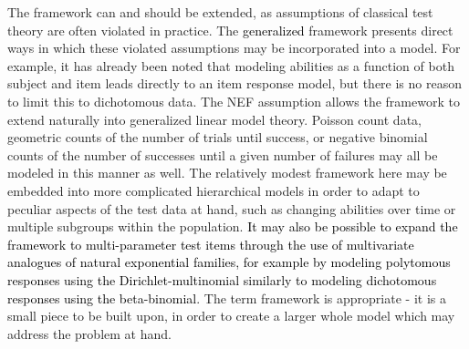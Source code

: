 \documentclass[12pt,epsfig]{article}
\newcommand{\change}[1]{\textcolor{black}{#1}}
\begin{document}
The framework can and should be extended, as assumptions of classical test theory are often violated in practice. The \change{generalized} framework presents direct ways in which these violated assumptions may be incorporated into a model.  For example, it has already been noted that modeling abilities as a function of both subject and item leads directly to an item response model, but there is no reason to limit this to dichotomous data. The NEF assumption allows the framework to extend naturally into generalized linear model theory. Poisson count data, geometric counts of the number of trials until success, or negative binomial counts of the number of successes until a given number of failures may all be modeled in this manner as well. The relatively modest framework here may be embedded into more complicated hierarchical models in order to adapt to peculiar aspects of the test data at hand, such as changing abilities over time or multiple subgroups within the population. \change{It may also be possible to expand the framework to multi-parameter test items through the use of multivariate analogues of natural exponential families, for example by modeling polytomous responses using the Dirichlet-multinomial similarly to modeling dichotomous responses using the beta-binomial}. The term framework is appropriate - it is a small piece to be built upon, in order to create a larger whole model which may address the problem at hand.




\end{document}
